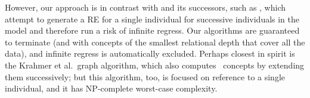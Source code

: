 However, our approach is in contrast with
 and its successors,
such as , which
attempt to generate a RE for a single individual for successive
individuals in the model and therefore run a risk of infinite regress.
Our algorithms are guaranteed to terminate (and with concepts of the
smallest relational depth that cover all the data), and infinite
regress is automatically excluded.  Perhaps closest in spirit is the
Krahmer et al.\ graph algorithm, which also computes \el\ concepts by
extending them successively; but this algorithm, too, is focused on
reference to a single individual, and it has NP-complete worst-case
complexity.







